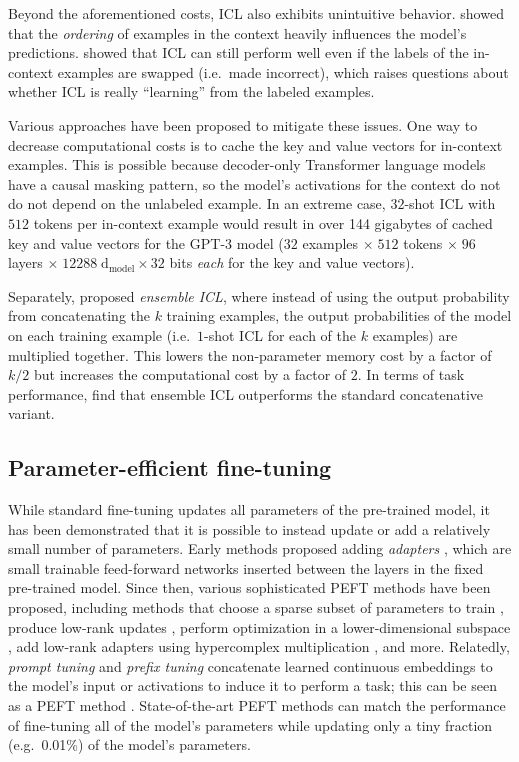 Beyond the aforementioned costs, ICL also exhibits unintuitive behavior.
\citet{zhao2021calibrate} showed that the \textit{ordering} of examples in the context heavily influences the model's predictions. 
\citet{min2022rethinking} showed that ICL can still perform well even if the labels of the in-context examples are swapped (i.e.\ made incorrect), which raises questions about whether ICL is really ``learning'' from the labeled examples. 

Various approaches have been proposed to mitigate these issues. One way to decrease computational costs is to cache the key and value vectors for in-context examples. This is possible because decoder-only Transformer language models have a causal masking pattern, so the model's activations for the context do not do not depend on the unlabeled example. In an extreme case, $32$-shot ICL with $512$ tokens per in-context example would result in over 144 gigabytes of cached key and value vectors for the GPT-3 model ($32$ examples $\times\;512$ tokens $\times\;96$ layers $\times\;12288\;\mathrm{d_{model}} \times 32$ bits \textit{each} for the key and value vectors).

Separately, \citet{min2021noisy} proposed \textit{ensemble ICL}, where instead of using the output probability from concatenating the $k$ training examples, the output probabilities of the model on each training example (i.e.\ $1$-shot ICL for each of the $k$ examples) are multiplied together. This lowers the non-parameter memory cost by a factor of $k/2$ but increases the computational cost by a factor of $2$. In terms of task performance, \citet{min2021noisy} find that ensemble ICL outperforms the standard concatenative variant.

\subsection{Parameter-efficient fine-tuning}

While standard fine-tuning updates all parameters of the pre-trained model, it has been demonstrated that it is possible to instead update or add a relatively small number of parameters. Early methods proposed adding \textit{adapters} \cite{rebuffi2017learning,Houlsby2019ParameterEfficientTL,bapna2019simple}, which are small trainable feed-forward networks inserted between the layers in the fixed pre-trained model. Since then, various sophisticated PEFT methods have been proposed, including methods that choose a sparse subset of parameters to train \cite{guo2020parameter,sung2021training}, produce low-rank updates \cite{hu2021lora}, perform optimization in a lower-dimensional subspace \cite{aghajanyan2020intrinsic}, add low-rank adapters using hypercomplex multiplication \cite{mahabadi2021compacter}, and more. Relatedly, \textit{prompt tuning} \cite{lester2021power} and \textit{prefix tuning} \cite{li2021prefix} concatenate learned continuous embeddings to the model's input or activations to induce it to perform a task; this can be seen as a PEFT method \cite{he2021towards}. State-of-the-art PEFT methods can match the performance of fine-tuning all of the model's parameters while updating only a tiny fraction (e.g.\ 0.01\%) of the model's parameters.

